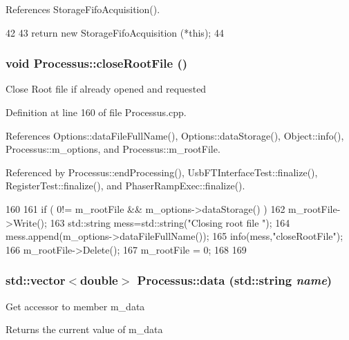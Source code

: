 References StorageFifoAcquisition().


\begin{DoxyCode}
42                                  {
43     return new StorageFifoAcquisition (*this);
44   }
\end{DoxyCode}
\hypertarget{classProcessus_a2f3c41e99da4c738ea3d8f7b0d20a665}{
\subsubsection[{closeRootFile}]{\setlength{\rightskip}{0pt plus 5cm}void Processus::closeRootFile ()}}
\label{classProcessus_a2f3c41e99da4c738ea3d8f7b0d20a665}
Close Root file if already opened and requested 

Definition at line 160 of file Processus.cpp.

References Options::dataFileFullName(), Options::dataStorage(), Object::info(), Processus::m\_\-options, and Processus::m\_\-rootFile.

Referenced by Processus::endProcessing(), UsbFTInterfaceTest::finalize(), RegisterTest::finalize(), and PhaserRampExec::finalize().


\begin{DoxyCode}
160                                 {
161   if ( 0!= m_rootFile && m_options->dataStorage() ){
162     m_rootFile->Write();
163         std::string mess=std::string("Closing root file ");
164         mess.append(m_options->dataFileFullName());
165         info(mess,"closeRootFile");
166     m_rootFile->Delete();
167     m_rootFile = 0;
168   }
169 }
\end{DoxyCode}
\hypertarget{classProcessus_abf4d91fb36707e1d50178bab12d21ae9}{
\subsubsection[{data}]{\setlength{\rightskip}{0pt plus 5cm}std::vector$<$double$>$ Processus::data (std::string {\em name})}}
\label{classProcessus_abf4d91fb36707e1d50178bab12d21ae9}
Get accessor to member m\_\-data \begin{DoxyReturn}{Returns}
the current value of m\_\-data 
\end{DoxyReturn}


